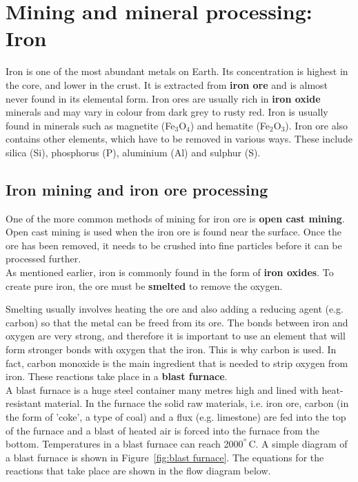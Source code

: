 



\section{Mining and mineral processing: Iron}
\label{sec:mining:iron}

Iron is one of the most abundant metals on Earth. Its concentration is highest in the core, and lower in the crust. It is extracted from \textbf{iron ore} and is almost never found in its elemental form. Iron ores are usually rich in \textbf{iron oxide} minerals and may vary in colour from dark grey to rusty red. Iron is usually found in minerals such as magnetite (Fe$_{3}$O$_{4}$) and hematite (Fe$_{2}$O$_{3}$). Iron ore also contains other elements, which have to be removed in various ways. These include silica (Si), phosphorus (P), aluminium (Al) and sulphur (S).

\subsection{Iron mining and iron ore processing}

One of the more common methods of mining for iron ore is \textbf{open cast mining}. Open cast mining is used when the iron ore is found near the surface. Once the ore has been removed, it needs to be crushed into fine particles before it can be processed further.\\

As mentioned earlier, iron is commonly found in the form of \textbf{iron oxides}. To create pure iron, the ore must be \textbf{smelted} to remove the oxygen.


Smelting usually involves heating the ore and also adding a reducing agent (e.g.\@{} carbon) so that the metal can be freed from its ore. The bonds between iron and oxygen are very strong, and therefore it is important to use an element that will form stronger bonds with oxygen that the iron. This is why carbon is used. In fact, carbon monoxide is the main ingredient that is needed to strip oxygen from iron. These reactions take place in a \textbf{blast furnace}.\\

A blast furnace is a huge steel container many metres high and lined with heat-resistant material. In the furnace the solid raw materials, i.e.\@{} iron ore, carbon (in the form of 'coke', a type of coal) and a flux (e.g.\@{} limestone) are fed into the top of the furnace and a blast of heated air is forced into the furnace from the bottom. Temperatures in a blast furnace can reach 2000$^{^{\circ}}$C. A simple diagram of a blast furnace is shown in Figure~\ref{fig:blast furnace}. The equations for the reactions that take place are shown in the flow diagram below. \\


